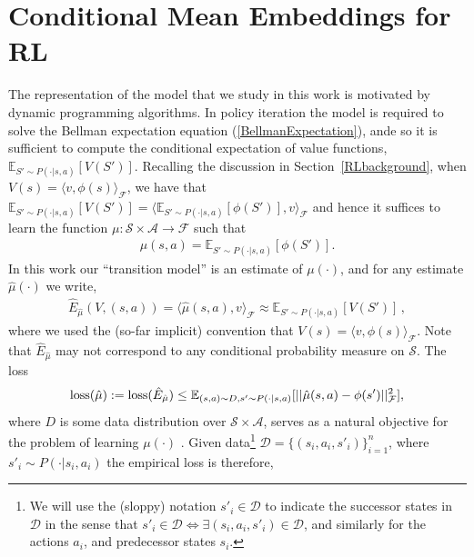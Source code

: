 \documentclass[letterpaper]{article}
\newcommand{\GrunewalderEmbeddingsRegression}{GrunewalderEmbeddingsRegression}
\newcommand{\cD}{{\mathcal D}}
\newcommand{\cF}{{\mathcal F}}
\newcommand{\cA}{{\mathcal A}}
\newcommand{\cS}{{\mathcal S}}
\newcommand{\E}{{\mathbb E}}
\newcommand{\R}{{\mathbb R}}
\newcommand{\loss}{\operatornamewithlimits{loss}}
\newcommand{\lang}{\langle}
\newcommand{\rang}{\rangle}
\newcommand{\nn}{\nonumber}
\begin{document}
\section{Conditional Mean Embeddings for RL} \label{CMEsforRL}

The representation of the model that we study in this work is motivated by dynamic programming algorithms. In policy iteration the model is required to solve the Bellman expectation equation (\ref{BellmanExpectation}), ande so it is sufficient to compute the conditional expectation of value functions, $\E_{S'\sim P(\cdot|s,a)}[V(S')]$. %
Recalling the discussion in Section~\ref{RLbackground}, when $V(s)= \lang v,\phi(s) \rang_{\cF}$, we have that $\E_{S'\sim P(\cdot|s,a)}[V(S')] = \lang \E_{S'\sim P(\cdot|s,a)}[\phi(S')] , v \rang_\cF$ and hence it suffices to learn the function $\mu:\cS\times\cA\to\cF$ such that 
\begin{align}
\mu(s,a) = \E_{S'\sim P(\cdot|s,a)}[\phi(S')]. \label{muDef}
\end{align}
In this work our ``transition model'' is an estimate of $\mu(\cdot)$, and for any estimate $\hat \mu(\cdot)$ we write,
\begin{align}
\hat E_{\hat\mu}(V,(s,a)) =  \lang \hat \mu(s,a) , v \rang_\cF \approx  \E_{S'\sim P(\cdot|s,a)}[V(S')]\,, \label{hatEDef}
\end{align}
where we used the (so-far implicit) convention that $V(s) =\lang v, \phi(s) \rang_{\cF}$.
Note that $\hat E_{\hat\mu}$ may not correspond to any conditional probability measure on $\cS$. The loss
\begin{align}
\loss(\hat \mu) := \loss(\hat E_{\hat \mu}) \le \E_{(s,a)\sim D, s' \sim P(\cdot|s,a)}[ || \hat\mu (s,a) - \phi(s') ||_\cF^2 ], \nn
\end{align}
where $D$ is some data distribution over $\cS \times \cA$, serves as a natural objective for the problem of learning $\mu(\cdot)$ \citep{\GrunewalderEmbeddingsRegression}. Given data\footnote{We will use the (sloppy) notation $s'_i\in\cD$ to indicate the successor states in $\cD$ in the sense that $s'_i\in\cD \Leftrightarrow\exists (s_i,a_i,s'_i)\in\cD$, and similarly for the actions $a_i$, and predecessor states $s_i$.} $\cD = \{(s_i,a_i,s'_i)\}_{i=1}^n$, where $s'_i\sim P(\cdot|s_i,a_i)$ the empirical loss is therefore,
\end{document}
